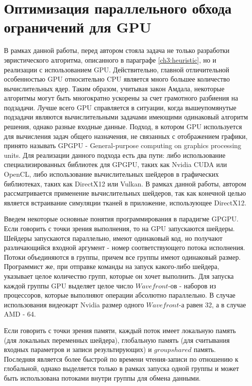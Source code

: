 \section{Оптимизация параллельного обхода ограничений для GPU} \label{ch3:chunks}
	В рамках данной работы, перед автором стояла задача не только разработки эвристического алгоритма, описанного в параграфе \ref{ch3:heuristic}, но и реализации с использованием GPU. Действительно, главной отличительной особенностью GPU относительно CPU является много большее количество вычислительных ядер. Таким образом, учитывая закон Амдала, некоторые алгоритмы могут быть многократно ускорены за счет грамотного разбиения на подзадачи. Лучше всего GPU справляется в ситуации, когда вышеупомянутые подзадачи являются вычислительными задачами имеющими одинаковый алгоритм решения, однако разные входные данные. Подход, в котором GPU используется для вычисления задач общего назначения, не связанных с отображением графики, принято называть GPGPU - General-purpose computing on graphics processing units. Для реализации данного подхода есть два пути: либо использование специализированных библиотек для GPGPU, таких как Nvidia CUDA или OpenCL, либо использование вычислительных шейдеров в графических библиотеках, таких как DirectX12 или Vulkan. В рамках данной работы, автором рассматривается применение вычислительных шейдеров, так как конечной целью является встраивание симуляции тканей в приложение, использующее DirectX12.
	
	Введем некоторые основные понятия программирования в парадигме GPGPU. Если говорить с точки зрения выполнения, то на GPU запускаются шейдеры. Шейдеры запускаются параллельно, имеют одинаковый код, но получают различающийся входной аргумент - номер соответствующего потока исполнения. Потоки объединяются в группы, причем все группы имеют одинаковый размер. Программист же, при отправке команды на запуск какого-либо шейдера, указывает целое количество групп, которые он хочет выполнить. Для запуска каждой группы GPU выделяет целое число $Wavefront$-ов - наборов из процессоров, которые выполняют операции абсолютно параллельно. В случае использования видеокарт Nvidia размер одного $Wavefront$-а равен 32, а в случае AMD - 64.
	
	Если говорить с точки зрения памяти, каждый поток имеет локальную память (для локальных переменных шейдера), глобальную память (для считывания входных параметров и записи результирующих) и $groupshared$ память. Последняя является более быстрой по времени чтения-записи по отношению к глобальной, однако выделяется только в рамках запуска одной группы и может быть использована потоками внутри группы для обмена данными.
	

